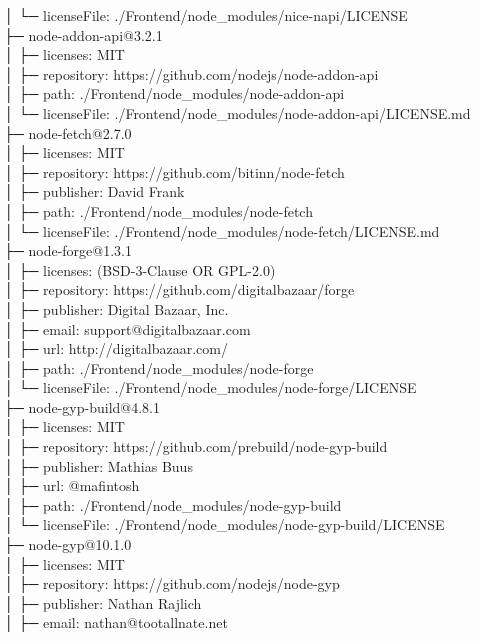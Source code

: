 │  └─ licenseFile: ./Frontend/node\_modules/nice-napi/LICENSE\\
├─ node-addon-api@3.2.1\\
│  ├─ licenses: MIT\\
│  ├─ repository: https://github.com/nodejs/node-addon-api\\
│  ├─ path: ./Frontend/node\_modules/node-addon-api\\
│  └─ licenseFile: ./Frontend/node\_modules/node-addon-api/LICENSE.md\\
├─ node-fetch@2.7.0\\
│  ├─ licenses: MIT\\
│  ├─ repository: https://github.com/bitinn/node-fetch\\
│  ├─ publisher: David Frank\\
│  ├─ path: ./Frontend/node\_modules/node-fetch\\
│  └─ licenseFile: ./Frontend/node\_modules/node-fetch/LICENSE.md\\
├─ node-forge@1.3.1\\
│  ├─ licenses: (BSD-3-Clause OR GPL-2.0)\\
│  ├─ repository: https://github.com/digitalbazaar/forge\\
│  ├─ publisher: Digital Bazaar, Inc.\\
│  ├─ email: support@digitalbazaar.com\\
│  ├─ url: http://digitalbazaar.com/\\
│  ├─ path: ./Frontend/node\_modules/node-forge\\
│  └─ licenseFile: ./Frontend/node\_modules/node-forge/LICENSE\\
├─ node-gyp-build@4.8.1\\
│  ├─ licenses: MIT\\
│  ├─ repository: https://github.com/prebuild/node-gyp-build\\
│  ├─ publisher: Mathias Buus\\
│  ├─ url: @mafintosh\\
│  ├─ path: ./Frontend/node\_modules/node-gyp-build\\
│  └─ licenseFile: ./Frontend/node\_modules/node-gyp-build/LICENSE\\
├─ node-gyp@10.1.0\\
│  ├─ licenses: MIT\\
│  ├─ repository: https://github.com/nodejs/node-gyp\\
│  ├─ publisher: Nathan Rajlich\\
│  ├─ email: nathan@tootallnate.net\\
